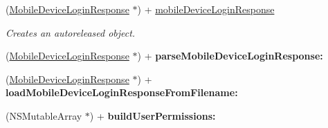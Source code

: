 \begin{DoxyCompactItemize}
\item 
(\hyperlink{interface_mobile_device_login_response}{MobileDeviceLoginResponse} $\ast$) + \hyperlink{interface_mobile_device_login_response_a363c8d6e00bd50c759900c29481ded4b}{mobileDeviceLoginResponse}
\begin{DoxyCompactList}\small\item\em Creates an autoreleased object. \item\end{DoxyCompactList}\item 
\hypertarget{interface_mobile_device_login_response_a88648f43c7bd8e5edb83f1dbbf1ec018}{
(\hyperlink{interface_mobile_device_login_response}{MobileDeviceLoginResponse} $\ast$) + {\bfseries parseMobileDeviceLoginResponse:}}
\label{interface_mobile_device_login_response_a88648f43c7bd8e5edb83f1dbbf1ec018}

\item 
\hypertarget{interface_mobile_device_login_response_a5c7ae1d367157437ce6a1618d1f6b801}{
(\hyperlink{interface_mobile_device_login_response}{MobileDeviceLoginResponse} $\ast$) + {\bfseries loadMobileDeviceLoginResponseFromFilename:}}
\label{interface_mobile_device_login_response_a5c7ae1d367157437ce6a1618d1f6b801}

\item 
\hypertarget{interface_mobile_device_login_response_a6f6e0f30126f6deb12ce3f921202b177}{
(NSMutableArray $\ast$) + {\bfseries buildUserPermissions:}}
\label{interface_mobile_device_login_response_a6f6e0f30126f6deb12ce3f921202b177}

\end{DoxyCompactItemize}
